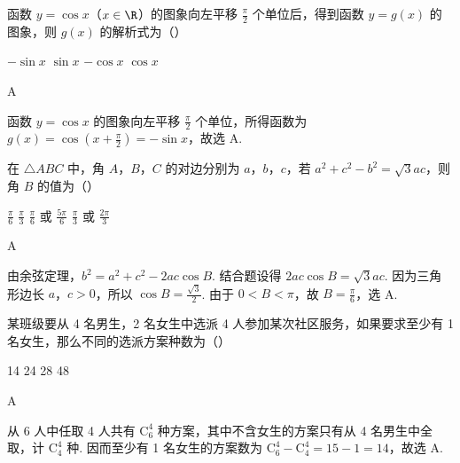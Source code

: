 \begin{problem}
函数 \(y = \cos x\)（\(x \in \R\)）的图象向左平移 \(\frac{\pi}{2}\) 个单位后，得到函数 \(y = g(x)\) 的图象，则 \(g(x)\) 的解析式为（\quad）

\choices
    {\(-\sin x\)}
    {\(\sin x\)}
    {\(-\cos x\)}
    {\(\cos x\)}

\begin{answer}
A
\end{answer}

\begin{solution}
函数 \(y=\cos x\) 的图象向左平移 \(\frac\pi2\) 个单位，所得函数为 \(g(x)=\cos\left(x+\frac\pi2\right)=-\sin x\)，故选 A.
\end{solution}
\end{problem}

\begin{problem}
在 \(\triangle ABC\) 中，角 \(A\)，\(B\)，\(C\) 的对边分别为 \(a\)，\(b\)，\(c\)，若 \(a^2 + c^2 - b^2 = \sqrt{3}ac\)，则角 \(B\) 的值为（\quad）

\choices
    {\(\frac{\pi}{6}\)}
    {\(\frac{\pi}{3}\)}
    {\(\frac{\pi}{6}\) 或 \(\frac{5\pi}{6}\)}
    {\(\frac{\pi}{3}\) 或 \(\frac{2\pi}{3}\)}

\begin{answer}
A
\end{answer}

\begin{solution}
由余弦定理，\(b^2=a^2+c^2-2ac\cos B\). 结合题设得 \(2ac\cos B=\sqrt3ac\). 因为三角形边长 \(a\)，\(c>0\)，所以 \(\cos B=\frac{\sqrt3}{2}\). 由于 \(0<B<\pi\)，故 \(B=\frac\pi6\)，选 A.
\end{solution}
\end{problem}

\begin{problem}
某班级要从 4 名男生，2 名女生中选派 4 人参加某次社区服务，如果要求至少有 1 名女生，那么不同的选派方案种数为（\quad）

\choices
    {14}
    {24}
    {28}
    {48}

\begin{answer}
A
\end{answer}

\begin{solution}
从 6 人中任取 4 人共有 \(\mathrm C_6^4\) 种方案，其中不含女生的方案只有从 4 名男生中全取，计 \(\mathrm C_4^4\) 种. 因而至少有 1 名女生的方案数为 \(\mathrm C_6^4-\mathrm C_4^4=15-1=14\)，故选 A.
\end{solution}
\end{problem}

